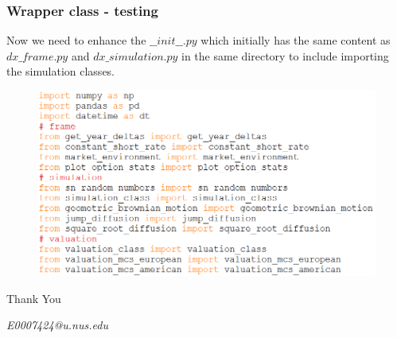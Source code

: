 \documentclass{beamer}
\begin{document}
\begin{frame}
\frametitle{Wrapper class - testing}
Now we need to enhance the $\_\_init\_\_.py$ which initially has the same content as $dx\_frame.py$ and $dx\_simulation.py$ in the same directory to include importing the simulation classes.
\begin{figure}[H]
	\includegraphics[scale=0.48]{overall_wrapper_class.png}
\end{figure}
\end{frame}

\begin{frame}
\Huge{\centerline{Thank You}}
\begin{center}
\begin{normalsize}
\emph{E0007424@u.nus.edu}
\end{normalsize}
\end{center}
\end{frame}

\end{document}
